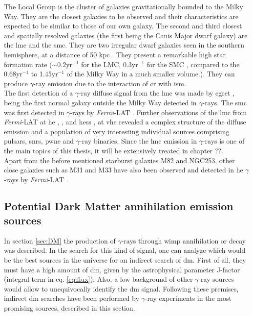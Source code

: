 \documentclass[main.tex]{subfiles}
\begin{document}
The Local Group is the cluster of galaxies gravitationally bounded to the Milky Way. They are the closest galaxies to be observed and their characteristics are expected to be similar to those of our own galaxy. The second and third closest and spatially resolved galaxies (the first being the Canis Major dwarf galaxy) are the \gls{lmc} and the \gls{smc}. They are two irregular dwarf galaxies seen in the southern hemisphere, at a distance of 50 kpc \cite{2018LMCdistance}. They present a remarkable high star formation rate ($\sim 0.2$yr$^{-1}$ for the LMC, $0.3$yr$^{-1}$ for the SMC \cite{2014LMCSFR}, compared to the 0.68yr$^{-1}$ to 1.45yr$^{-1}$ of the Milky Way \cite{2010MilkyWaySFR} in a much smaller volume.). They can produce $\gamma$-ray emission due to the interaction of \gls{cr} with \gls{ism}.\\
The first detection of a $\gamma$-ray diffuse signal from the \gls{lmc} was made by \gls{egret} \cite{1992LMCEgret}, being the first normal galaxy outside the Milky Way detected in $\gamma$-rays. The \gls{smc} was first detected in $\gamma$-rays by \textit{Fermi}-LAT \cite{2010SMCFermi}. Further observations of the \gls{lmc} from \textit{Fermi}-LAT at \gls{he} \cite{2010LMCFermifirst}, \cite{2016LMCFermi6years}, \cite{2016LMCFermiBinary} and \gls{hess} \cite{2015LMCHess}, \cite{2012LMCHessfirst} at \gls{vhe} revealed a complex structure of the diffuse emission and a population of very interesting individual sources comprising pulsars, \glspl{snr}, \gls{pwne} and $\gamma$-ray binaries. Since the \gls{lmc} emission in $\gamma$-rays is one of the main topics of this thesis, it will be extensively treated in chapter ??.\\
Apart from the before mentioned starburst galaxies M82 and NGC253, other close galaxies such as M31 and M33 have also been observed and detected in \gls{he} $\gamma$-rays by \textit{Fermi}-LAT \cite{2017M31M33Fermi}. 

\subsection{Potential Dark Matter annihilation emission sources}

In section \ref{sec:DM} the production of $\gamma$-rays through \gls{wimp} annihilation or decay was described. In the search for this kind of signal, one can analyze which would be the best sources in the universe for an indirect search of \gls{dm}. First of all, they must have a high amount of \gls{dm}, given by the astrophysical parameter J-factor (integral term in eq. \ref{eq:flux}). Also, a low background of other $\gamma$-ray sources would allow to unequivocally identify the \gls{dm} signal. Following these premises, indirect \gls{dm} searches have been performed by $\gamma$-ray experiments in the most promising sources, described in this section.\\
\end{document}
